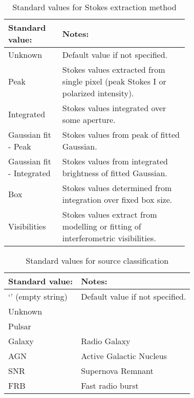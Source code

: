 \documentclass[10pt,modern]{aastex63}
\begin{document}
\begin{table}[h]
\caption{Standard values for Stokes extraction method}\label{tab:flux_type}
\begin{center}
\begin{tabular}{|l|p{0.7\linewidth}|} \hline
{\bf Standard value:} & {\bf Notes:} \\ \hline
Unknown & Default value if not specified.\\
Peak & Stokes values extracted from single pixel (peak Stokes I or polarized intensity).\\
Integrated & Stokes values integrated over some aperture.\\
Gaussian fit - Peak & Stokes values from peak of fitted Gaussian.\\
Gaussian fit - Integrated & Stokes values from integrated brightness of fitted Gaussian.\\
Box & Stokes values determined from integration over fixed box size.\\
Visibilities & Stokes values extract from modelling or fitting of interferometric visibilities.\\
\hline
\end{tabular}
\end{center}
\label{default}
\end{table}%





\begin{table}[h]
\caption{Standard values for source classification}\label{tab:source_type}
\begin{center}
\begin{tabular}{|l|l|} \hline
{\bf Standard value:} & {\bf Notes:} \\ \hline
`' (empty string) & Default value if not specified.\\
Unknown & \\
Pulsar & \\
Galaxy & Radio Galaxy \\
AGN & Active Galactic Nucleus \\
SNR & Supernova Remnant\\
FRB & Fast radio burst\\
\hline
\end{tabular}
\end{center}
\label{default}
\end{table}%

 \clearpage

{} %
\end{document}
